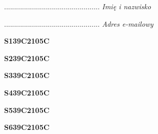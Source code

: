 \begin{turn}{90}\begin{minipage}{\linewidth} \vspace{20mm} ................................................  \textit{Imię i nazwisko}\end{minipage}\end{turn}

\begin{turn}{90}\begin{minipage}{\linewidth} \vspace{20mm} ................................................  \textit{Adres e-mailowy}\end{minipage}\end{turn}

\begin{turn}{90}\huge \begin{minipage}{\linewidth} \vspace{10mm}\textbf{S139C2105C}\end{minipage}\end{turn}

\begin{turn}{90}\huge \begin{minipage}{\linewidth} \vspace{10mm}\textbf{S239C2105C}\end{minipage}\end{turn}

\begin{turn}{90}\huge \begin{minipage}{\linewidth} \vspace{10mm}\textbf{S339C2105C}\end{minipage}\end{turn}

\begin{turn}{90}\huge \begin{minipage}{\linewidth} \vspace{10mm}\textbf{S439C2105C}\end{minipage}\end{turn}

\begin{turn}{90}\huge \begin{minipage}{\linewidth} \vspace{10mm}\textbf{S539C2105C}\end{minipage}\end{turn}

\begin{turn}{90}\huge \begin{minipage}{\linewidth} \vspace{10mm}\textbf{S639C2105C}\end{minipage}\end{turn}

